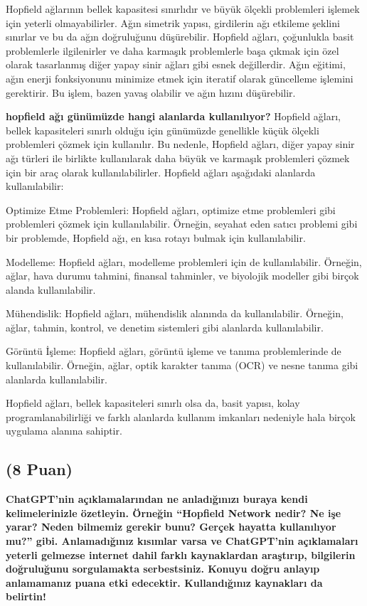 \documentclass[11pt]{article}
\begin{document}
Hopfield ağlarının bellek kapasitesi sınırlıdır ve büyük ölçekli problemleri işlemek için yeterli olmayabilirler.
Ağın simetrik yapısı, girdilerin ağı etkileme şeklini sınırlar ve bu da ağın doğruluğunu düşürebilir.
Hopfield ağları, çoğunlukla basit problemlerle ilgilenirler ve daha karmaşık problemlerle başa çıkmak için özel olarak tasarlanmış diğer yapay sinir ağları gibi esnek değillerdir.
Ağın eğitimi, ağın enerji fonksiyonunu minimize etmek için iteratif olarak güncelleme işlemini gerektirir. Bu işlem, bazen yavaş olabilir ve ağın hızını düşürebilir.

\textbf{hopfield ağı günümüzde hangi alanlarda kullanılıyor?}
Hopfield ağları, bellek kapasiteleri sınırlı olduğu için günümüzde genellikle küçük ölçekli problemleri çözmek için kullanılır. Bu nedenle, Hopfield ağları, diğer yapay sinir ağı türleri ile birlikte kullanılarak daha büyük ve karmaşık problemleri çözmek için bir araç olarak kullanılabilirler. Hopfield ağları aşağıdaki alanlarda kullanılabilir:

Optimize Etme Problemleri: Hopfield ağları, optimize etme problemleri gibi problemleri çözmek için kullanılabilir. Örneğin, seyahat eden satıcı problemi gibi bir problemde, Hopfield ağı, en kısa rotayı bulmak için kullanılabilir.

Modelleme: Hopfield ağları, modelleme problemleri için de kullanılabilir. Örneğin, ağlar, hava durumu tahmini, finansal tahminler, ve biyolojik modeller gibi birçok alanda kullanılabilir.

Mühendislik: Hopfield ağları, mühendislik alanında da kullanılabilir. Örneğin, ağlar, tahmin, kontrol, ve denetim sistemleri gibi alanlarda kullanılabilir.

Görüntü İşleme: Hopfield ağları, görüntü işleme ve tanıma problemlerinde de kullanılabilir. Örneğin, ağlar, optik karakter tanıma (OCR) ve nesne tanıma gibi alanlarda kullanılabilir.

Hopfield ağları, bellek kapasiteleri sınırlı olsa da, basit yapısı, kolay programlanabilirliği ve farklı alanlarda kullanım imkanları nedeniyle hala birçok uygulama alanına sahiptir.
\subsection{(8 Puan)} \textbf{ChatGPT’nin açıklamalarından ne anladığınızı buraya kendi kelimelerinizle özetleyin. Örneğin ``Hopfield Network nedir? Ne işe yarar? Neden bilmemiz gerekir bunu? Gerçek hayatta kullanılıyor mu?'' gibi. Anlamadığınız kısımlar varsa ve ChatGPT’nin açıklamaları yeterli gelmezse internet dahil farklı kaynaklardan araştırıp, bilgilerin doğruluğunu sorgulamakta serbestsiniz. Konuyu doğru anlayıp anlamamanız puana etki edecektir. Kullandığınız kaynakları da belirtin!}
\end{document}
